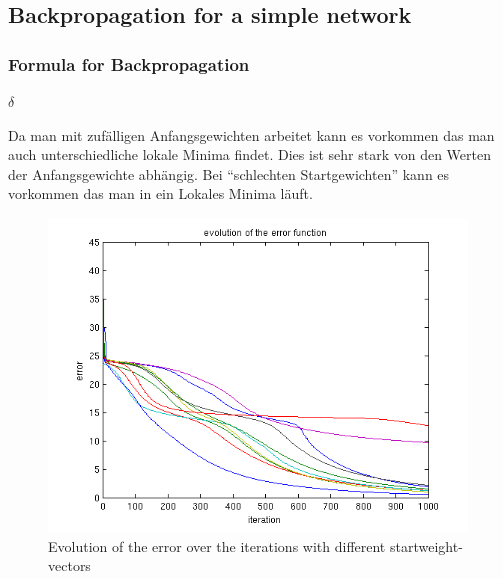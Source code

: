 \subsection{Backpropagation for a simple network}

\subsubsection{Formula for Backpropagation}
\begin{math}
 \delta
\end{math}


Da man mit zufälligen Anfangsgewichten arbeitet kann es vorkommen das man auch unterschiedliche lokale Minima findet.
Dies ist sehr stark von den Werten der Anfangsgewichte abhängig. Bei ``schlechten Startgewichten'' kann es vorkommen das man in ein Lokales Minima läuft.

\begin{figure}[hp!]
\begin{center}
 \includegraphics[width=0.99\textwidth]{./figures/1/error}
 \caption{Evolution of the error over the iterations with different startweight-vectors}
\label{fig:backprop_error}
\end{center}
\end{figure}



